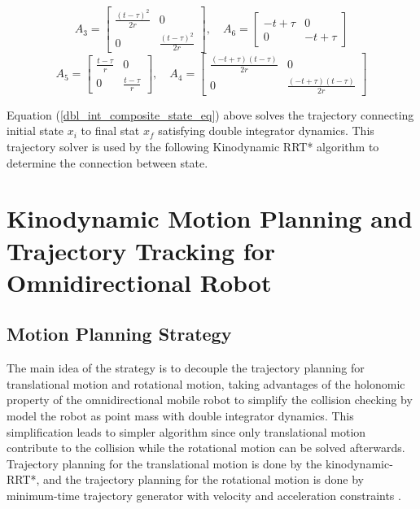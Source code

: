 \documentclass[conference]{IEEEtran}
\begin{document}
\begin{equation*}
A_3 = \begin{bmatrix}
\frac{(t-\tau)^2}{2r} & 0 \\
0 & \frac{(t-\tau)^2}{2r}
\end{bmatrix}
,\quad
A_6 = \begin{bmatrix}
-t+\tau & 0 \\
0 & -t+\tau
\end{bmatrix}
\end{equation*}
\begin{equation*}
A_5 = \begin{bmatrix}
\frac{t-\tau}{r} & 0\\
0 & \frac{t-\tau}{r}
\end{bmatrix}
,\quad
A_4 = \begin{bmatrix}
\frac{(-t+\tau)(t-\tau)}{2r} & 0 \\
0 & \frac{(-t+\tau)(t-\tau)}{2r}
\end{bmatrix} 
\end{equation*}

Equation (\ref{dbl_int_composite_state_eq}) above solves the trajectory connecting initial state $x_i$ to final stat $x_f$ satisfying double integrator dynamics. This trajectory solver is used by the following Kinodynamic RRT* algorithm to determine the connection between state.

\section{Kinodynamic Motion Planning and Trajectory Tracking for Omnidirectional Robot} \label{planning_tracking}

\subsection{Motion Planning Strategy}\label{MPS}
The main idea of the strategy is to decouple the trajectory planning for translational motion and rotational motion, taking advantages of the holonomic property of the omnidirectional mobile robot to simplify the collision checking by model the robot as point mass with double integrator dynamics. This simplification leads to simpler algorithm since only translational motion contribute to the collision while the rotational motion can be solved afterwards. Trajectory planning for the translational motion is done by the kinodynamic-RRT*, and the trajectory planning for the rotational motion is done by minimum-time trajectory generator with velocity and acceleration constraints \cite{purwin2006trajectory}.
\end{document}
